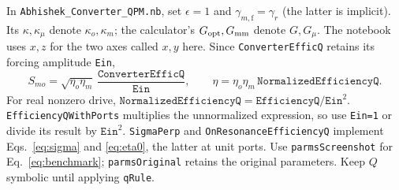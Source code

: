 \documentclass[aps,pra,onecolumn,10pt,letterpaper,notitlepage,nofootinbib,amsmath,amssymb]{revtex4-2}
\newcommand{\gadd}{\gamma_{m,\mathrm{f}}}
\begin{document}
In \texttt{Abhishek\_Converter\_QPM.nb}, set $\epsilon=1$ and
$\gadd=\gamma_r$ (the latter is implicit). Its $\kappa,\kappa_\mu$ denote
$\kappa_o,\kappa_m$; the calculator's $G_{\rm opt},G_{\rm mm}$ denote $G,G_\mu$.
The notebook uses $x,z$ for the two axes called $x,y$ here.
Since \texttt{ConverterEfficQ} retains its forcing amplitude \texttt{Ein},
\begin{equation}
 S_{mo}=\sqrt{\eta_o\eta_m}\,
 \frac{\texttt{ConverterEfficQ}}{\texttt{Ein}},\qquad
 \eta=\eta_o\eta_m\,\texttt{NormalizedEfficiencyQ}.
 \label{eq:notebook-normalization}
\end{equation}
For real nonzero drive,
$\texttt{NormalizedEfficiencyQ}=\texttt{EfficiencyQ}/\texttt{Ein}^2$.
\texttt{EfficiencyQWithPorts} multiplies the unnormalized expression, so use
\texttt{Ein=1} or divide its result by $\texttt{Ein}^2$.
\texttt{SigmaPerp} and \texttt{OnResonanceEfficiencyQ} implement
Eqs.~\eqref{eq:sigma} and \eqref{eq:eta0}, the latter at unit ports.
Use \texttt{parmsScreenshot} for Eq.~\eqref{eq:benchmark}; \texttt{parmsOriginal}
retains the original parameters. Keep $Q$ symbolic until applying \texttt{qRule}.


\end{document}
